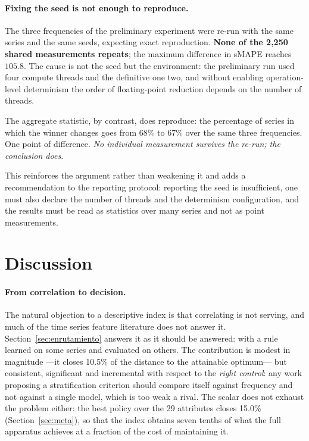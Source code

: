 \paragraph{Fixing the seed is not enough to reproduce.} The three frequencies of the
preliminary experiment were re-run with the same series and the same seeds, expecting
exact reproduction. \textbf{None of the 2{,}250 shared measurements repeats}; the maximum
difference in sMAPE reaches $105.8$. The cause is not the seed but the environment: the
preliminary run used four compute threads and the definitive one two, and without enabling
operation-level determinism the order of floating-point reduction depends on the number of
threads.

The aggregate statistic, by contrast, does reproduce: the percentage of series in which
the winner changes goes from 68\% to 67\% over the same three frequencies. One point of
difference. \emph{No individual measurement survives the re-run; the conclusion does.}

This reinforces the argument rather than weakening it and adds a recommendation to the
reporting protocol: reporting the seed is insufficient, one must also declare the number
of threads and the determinism configuration, and the results must be read as statistics
over many series and not as point measurements.


\section{Discussion}\label{sec:discusion}

\paragraph{From correlation to decision.} The natural objection to a descriptive index is
that correlating is not serving, and much of the time series feature literature does not
answer it. Section~\ref{sec:enrutamiento} answers it as it should be answered: with a rule
learned on some series and evaluated on others. The contribution is modest in magnitude
---it closes 10.5\% of the distance to the attainable optimum--- but consistent,
significant and incremental with respect to the \emph{right control}: any work proposing a
stratification criterion should compare itself against frequency and not against a single
model, which is too weak a rival. The scalar does not exhaust the problem either: the best
policy over the 29 attributes closes 15.0\% (Section~\ref{sec:meta}), so that the index
obtains seven tenths of what the full apparatus achieves at a fraction of the cost of
maintaining it.

